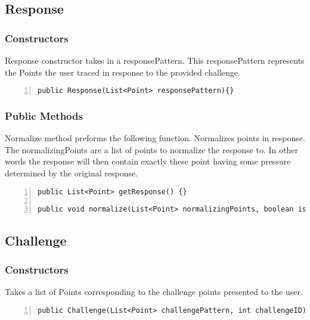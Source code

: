\documentclass{article} %
\begin{document}
\subsection{Response}
\subsubsection{Constructors}
Response constructor takes in a responsePattern. This responsePattern represents the Points the user traced in response to the provided challenge.
\begin{lstlisting}[numbers=left]
public Response(List<Point> responsePattern){}
\end{lstlisting}

\subsubsection{Public Methods}
Normalize method preforms the following function. Normalizes points in response. The normalizingPoints are a list of points to normalize the response to. In other words the response will then contain exactly these point having some pressure determined by the original response.
\begin{lstlisting}[numbers=left]
public List<Point> getResponse() {}

public void normalize(List<Point> normalizingPoints, boolean isChallengeHorizontal) {}
\end{lstlisting}

\subsection{Challenge}
\subsubsection{Constructors}
Takes a list of Points corresponding to the challenge points presented to the user.
\begin{lstlisting}[numbers=left]
public Challenge(List<Point> challengePattern, int challengeID) {}
\end{lstlisting}
\end{document}
